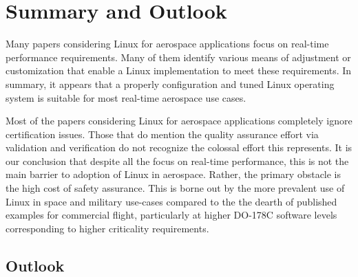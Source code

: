 \section{Summary and Outlook}
\label{sec:summary_outlook}

Many papers considering Linux for aerospace applications focus on real-time performance requirements. Many of them identify various means of adjustment or customization that enable a Linux implementation to meet these requirements. In summary, it appears that a properly configuration and tuned Linux operating system is suitable for most real-time aerospace use cases.

Most of the papers considering Linux for aerospace applications completely ignore certification issues. Those that do mention the quality assurance effort via validation and verification do not recognize the colossal effort this represents. It is our conclusion that despite all the focus on real-time performance, this is not the main barrier to adoption of Linux in aerospace. Rather, the primary obstacle is the high cost of safety assurance. This is borne out by the more prevalent use of Linux in space and military use-cases compared to the the dearth of published examples for commercial flight, particularly at higher DO-178C software levels corresponding to higher criticality requirements.

\subsection{Outlook}
